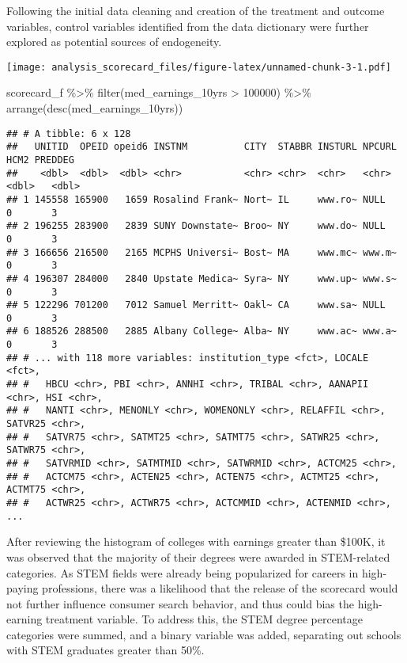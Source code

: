 \documentclass[
]{article}
\newenvironment{Shaded}{\begin{snugshade}}{\end{snugshade}}
\newcommand{\DecValTok}[1]{\textcolor[rgb]{0.00,0.00,0.81}{#1}}
\newcommand{\FunctionTok}[1]{\textcolor[rgb]{0.00,0.00,0.00}{#1}}
\newcommand{\NormalTok}[1]{#1}
\newcommand{\SpecialCharTok}[1]{\textcolor[rgb]{0.00,0.00,0.00}{#1}}
\begin{document}
Following the initial data cleaning and creation of the treatment and
outcome variables, control variables identified from the data dictionary
were further explored as potential sources of endogeneity.

\texttt{[image: analysis\_scorecard\_files/figure-latex/unnamed-chunk-3-1.pdf]}

\begin{Shaded}
\begin{Highlighting}[]
\NormalTok{scorecard\_f }\SpecialCharTok{\%\textgreater{}\%} \FunctionTok{filter}\NormalTok{(med\_earnings\_10yrs }\SpecialCharTok{\textgreater{}} \DecValTok{100000}\NormalTok{) }\SpecialCharTok{\%\textgreater{}\%} \FunctionTok{arrange}\NormalTok{(}\FunctionTok{desc}\NormalTok{(med\_earnings\_10yrs))}
\end{Highlighting}
\end{Shaded}

\begin{verbatim}
## # A tibble: 6 x 128
##   UNITID  OPEID opeid6 INSTNM          CITY  STABBR INSTURL NPCURL  HCM2 PREDDEG
##    <dbl>  <dbl>  <dbl> <chr>           <chr> <chr>  <chr>   <chr>  <dbl>   <dbl>
## 1 145558 165900   1659 Rosalind Frank~ Nort~ IL     www.ro~ NULL       0       3
## 2 196255 283900   2839 SUNY Downstate~ Broo~ NY     www.do~ NULL       0       3
## 3 166656 216500   2165 MCPHS Universi~ Bost~ MA     www.mc~ www.m~     0       3
## 4 196307 284000   2840 Upstate Medica~ Syra~ NY     www.up~ www.s~     0       3
## 5 122296 701200   7012 Samuel Merritt~ Oakl~ CA     www.sa~ NULL       0       3
## 6 188526 288500   2885 Albany College~ Alba~ NY     www.ac~ www.a~     0       3
## # ... with 118 more variables: institution_type <fct>, LOCALE <fct>,
## #   HBCU <chr>, PBI <chr>, ANNHI <chr>, TRIBAL <chr>, AANAPII <chr>, HSI <chr>,
## #   NANTI <chr>, MENONLY <chr>, WOMENONLY <chr>, RELAFFIL <chr>, SATVR25 <chr>,
## #   SATVR75 <chr>, SATMT25 <chr>, SATMT75 <chr>, SATWR25 <chr>, SATWR75 <chr>,
## #   SATVRMID <chr>, SATMTMID <chr>, SATWRMID <chr>, ACTCM25 <chr>,
## #   ACTCM75 <chr>, ACTEN25 <chr>, ACTEN75 <chr>, ACTMT25 <chr>, ACTMT75 <chr>,
## #   ACTWR25 <chr>, ACTWR75 <chr>, ACTCMMID <chr>, ACTENMID <chr>, ...
\end{verbatim}

After reviewing the histogram of colleges with earnings greater than
\$100K, it was observed that the majority of their degrees were awarded
in STEM-related categories. As STEM fields were already being
popularized for careers in high-paying professions, there was a
likelihood that the release of the scorecard would not further influence
consumer search behavior, and thus could bias the high-earning treatment
variable. To address this, the STEM degree percentage categories were
summed, and a binary variable was added, separating out schools with
STEM graduates greater than 50\%.
\end{document}
